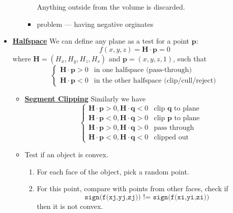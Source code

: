 \documentclass[twocolumn,landscape,10pt]{article}
\theoremstyle{definition}
\begin{document}
\begin{itemize}
\begin{itemize}
\begin{itemize}
                        Anything outside from the volume is discarded.
                    \item problem --- having negative orginates 
                \end{itemize} 
        \end{itemize} 
    \item \underline{\textbf{Halfspace}} We can define any plane as a test for a
        point $\mathbf{p}$:
        \[
            f(x,y,z)=\mathbf{H}\cdot \mathbf{p}=0
        \]
        where $\mathbf{H}=(H_x,H_y,H_z,H_s)$ and $\mathbf{p}=(x,y,z,1)$,
        such that 
        \[
            \begin{cases}
                \mathbf{H}\cdot \mathbf{p}>0  & \text{in one halfspace (pass-through)}\\
                \mathbf{H}\cdot \mathbf{p}<0 & \text{in the other halfspace (clip/cull/reject)}
            \end{cases} 
        \]
        \begin{itemize}
            \item \underline{\textbf{Segment Clipping}} Similarly we have
                \[
                    \begin{cases}
                        \mathbf{H}\cdot\mathbf{p}>0, \mathbf{H}\cdot\mathbf{q}<0
                        & \text{clip $\mathbf{q}$ to plane} \\
                        \mathbf{H}\cdot\mathbf{p}<0, \mathbf{H}\cdot\mathbf{q}>0
                        & \text{clip $\mathbf{p}$ to plane} \\
                        \mathbf{H}\cdot\mathbf{p}>0, \mathbf{H}\cdot\mathbf{q}>0
                        & \text{pass through} \\
                        \mathbf{H}\cdot\mathbf{p}<0, \mathbf{H}\cdot\mathbf{q}<0
                        & \text{clipped out}
                    \end{cases} 
                \]
            \item Test if an object is convex.
                \begin{enumerate}
                    \item For each face of the object, pick a random point.
                    \item For this point, compare with points from other faces,
                        check if
                        \[
                            \texttt{sign(f(xj,yj,zj)) != sign(f(xi,yi,zi))}
                        \]
                        then it is not convex.

\end{enumerate}
\end{itemize}
\end{itemize}
\end{document}
